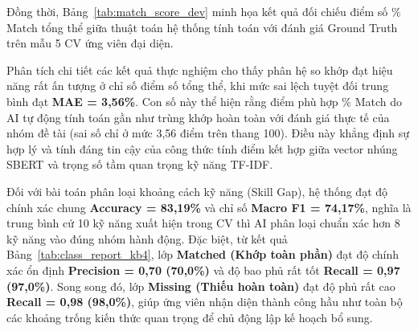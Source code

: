 Đồng thời, Bảng~\ref{tab:match_score_dev} minh họa kết quả đối chiếu điểm số \% Match tổng thể giữa thuật toán hệ thống tính toán với đánh giá Ground Truth trên mẫu 5 CV ứng viên đại diện.

\begin{table}[H]
\caption{Bảng đối chiếu điểm số Match Score giữa Hệ thống và Ground Truth}
\label{tab:match_score_dev}
\begin{center}
\end{center}
\end{table}

Phân tích chi tiết các kết quả thực nghiệm cho thấy phân hệ so khớp đạt hiệu năng rất ấn tượng ở chỉ số điểm số tổng thể, khi mức sai lệch tuyệt đối trung bình đạt \textbf{MAE = 3,56\%}. Con số này thể hiện rằng điểm phù hợp \% Match do AI tự động tính toán gần như trùng khớp hoàn toàn với đánh giá thực tế của nhóm đề tài (sai số chỉ ở mức 3,56 điểm trên thang 100). Điều này khẳng định sự hợp lý và tính đáng tin cậy của công thức tính điểm kết hợp giữa vector nhúng SBERT và trọng số tầm quan trọng kỹ năng TF-IDF.

Đối với bài toán phân loại khoảng cách kỹ năng (Skill Gap), hệ thống đạt độ chính xác chung \textbf{Accuracy = 83,19\%} và chỉ số \textbf{Macro F1 = 74,17\%}, nghĩa là trung bình cứ 10 kỹ năng xuất hiện trong CV thì AI phân loại chuẩn xác hơn 8 kỹ năng vào đúng nhóm hành động. Đặc biệt, từ kết quả Bảng~\ref{tab:class_report_kb4}, lớp \textbf{Matched (Khớp toàn phần)} đạt độ chính xác ổn định \textbf{Precision = 0,70 (70,0\%)} và độ bao phủ rất tốt \textbf{Recall = 0,97 (97,0\%)}. Song song đó, lớp \textbf{Missing (Thiếu hoàn toàn)} đạt độ phủ rất cao \textbf{Recall = 0,98 (98,0\%)}, giúp ứng viên nhận diện thành công hầu như toàn bộ các khoảng trống kiến thức quan trọng để chủ động lập kế hoạch bổ sung.


